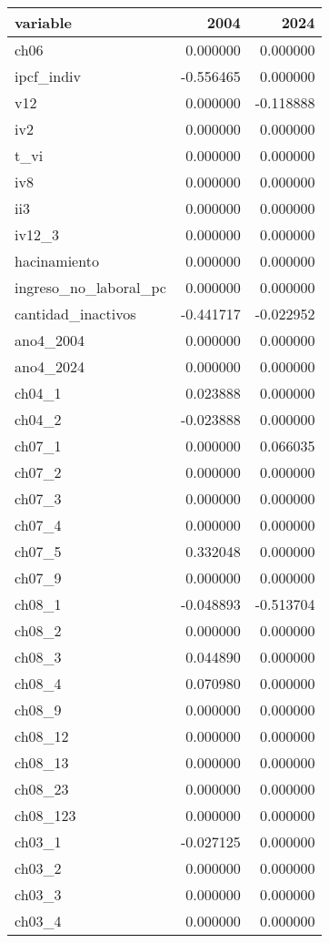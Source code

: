 \begin{tabular}{lrr}
\toprule
variable & 2004 & 2024 \\
\midrule
ch06 & 0.000000 & 0.000000 \\
ipcf_indiv & -0.556465 & 0.000000 \\
v12 & 0.000000 & -0.118888 \\
iv2 & 0.000000 & 0.000000 \\
t_vi & 0.000000 & 0.000000 \\
iv8 & 0.000000 & 0.000000 \\
ii3 & 0.000000 & 0.000000 \\
iv12_3 & 0.000000 & 0.000000 \\
hacinamiento & 0.000000 & 0.000000 \\
ingreso_no_laboral_pc & 0.000000 & 0.000000 \\
cantidad_inactivos & -0.441717 & -0.022952 \\
ano4_2004 & 0.000000 & 0.000000 \\
ano4_2024 & 0.000000 & 0.000000 \\
ch04_1 & 0.023888 & 0.000000 \\
ch04_2 & -0.023888 & 0.000000 \\
ch07_1 & 0.000000 & 0.066035 \\
ch07_2 & 0.000000 & 0.000000 \\
ch07_3 & 0.000000 & 0.000000 \\
ch07_4 & 0.000000 & 0.000000 \\
ch07_5 & 0.332048 & 0.000000 \\
ch07_9 & 0.000000 & 0.000000 \\
ch08_1 & -0.048893 & -0.513704 \\
ch08_2 & 0.000000 & 0.000000 \\
ch08_3 & 0.044890 & 0.000000 \\
ch08_4 & 0.070980 & 0.000000 \\
ch08_9 & 0.000000 & 0.000000 \\
ch08_12 & 0.000000 & 0.000000 \\
ch08_13 & 0.000000 & 0.000000 \\
ch08_23 & 0.000000 & 0.000000 \\
ch08_123 & 0.000000 & 0.000000 \\
ch03_1 & -0.027125 & 0.000000 \\
ch03_2 & 0.000000 & 0.000000 \\
ch03_3 & 0.000000 & 0.000000 \\
ch03_4 & 0.000000 & 0.000000 \\

\end{tabular}
